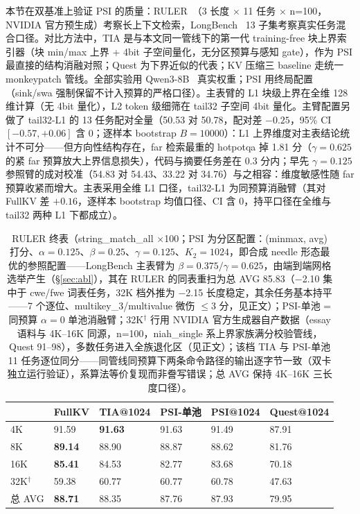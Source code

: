 \documentclass[11pt]{article}
\begin{document}
本节在双基准上验证 PSI 的质量：RULER~\cite{ruler}（3 长度 $\times$ 11 任务 $\times$ n=100，NVIDIA 官方预生成）考察长上下文检索，LongBench~\cite{longbench} 13 子集考察真实任务混合口径。对比方法中，TIA 是与本文同一管线下的第一代 training-free 块上界索引器（块 min/max 上界 + 4bit 子空间量化，无分区预算与感知 gate），作为 PSI 最直接的结构消融对照；Quest 为下界近似的代表；KV 压缩三 baseline 走统一 monkeypatch 管线。全部实验用 Qwen3-8B~\cite{qwen3} 真实权重；PSI 用终局配置（sink/swa 强制保留不计入预算的严格口径）。主表臂的 L1 块级上界在全维 128 维计算（无 4bit 量化），L2 token 级细筛在 tail32 子空间 4bit 量化。主臂配置另做了 tail32-L1 的 13 任务配对全量（50.53 对 50.78，配对差 $-0.25$，95\% CI $[-0.57, +0.06]$ 含 0；逐样本 bootstrap $B{=}10000$）：L1 上界维度对主表结论统计不可分——但方向性结构存在，far 检索最重的 hotpotqa 掉 1.81 分（$\gamma{=}0.625$ 的紧 far 预算放大上界信息损失），代码与摘要任务差在 0.3 分内；早先 $\gamma{=}0.125$ 参照臂的成对校准（54.83 对 54.43、33.22 对 34.76）与之相容：维度敏感性随 far 预算收紧而增大。主表采用全维 L1 口径，tail32-L1 为同预算消融臂（其对 FullKV 差 $+0.16$，逐样本 bootstrap 均值口径、CI 含 0，持平口径在全维与 tail32 两种 L1 下都成立）。

\begin{table}[h]\centering
\caption{RULER 终表（string\_match\_all $\times$100；PSI 为分区配置：(minmax, avg) 打分、$\alpha{=}0.125$、$\beta{=}0.25$、$\gamma{=}0.125$、$K_2{=}1024$，即合成 needle 形态最优的参照配置——LongBench 主表臂为 $\beta{=}0.375/\gamma{=}0.625$，由端到端网格选举产生（\S\ref{sec:abl}），其在 RULER 的同表重扫为总 AVG 85.83（$-$2.10 集中于 cwe/fwe 词表任务，32K 档外推为 $-$2.15 长度稳定，其余任务基本持平——7 个逐位、multikey\_3/multivalue 微伤 $\leq$3 分，见正文）；PSI-单池 = 同预算 $\alpha{=}0$ 单池消融臂；32K$^\dagger$ 行用 NVIDIA 官方生成器自产数据（essay 语料与 4K--16K 同源，n=100，niah\_single 系上界家族满分校验管线，Quest 91--98），多数任务进入全族退化区（见正文）；该档 TIA 与 PSI-单池 11 任务逐位同分——同管线同预算下两条命令路径的输出逐字节一致（双卡独立运行验证），系算法等价复现而非誊写错误；总 AVG 保持 4K--16K 三长度口径）。}
\begin{tabular}{llllll}
\toprule
 & FullKV & TIA@1024 & PSI-单池 & PSI@1024 & Quest@1024 \\
\midrule
4K & 91.59 & \textbf{91.63} & 91.63 & 91.49 & 87.91 \\
8K & \textbf{89.14} & 88.90 & 88.87 & 88.62 & 81.76 \\
16K & \textbf{85.41} & 84.53 & 82.77 & 83.68 & 70.18 \\
32K$^\dagger$ & 59.38 & 60.77 & 60.77 & 60.78 & 47.63 \\
\addlinespace
总 AVG & \textbf{88.71} & 88.35 & 87.76 & 87.93 & 79.95 \\
\bottomrule
\end{tabular}
\label{tab:ruler}
\end{table}
\end{document}
